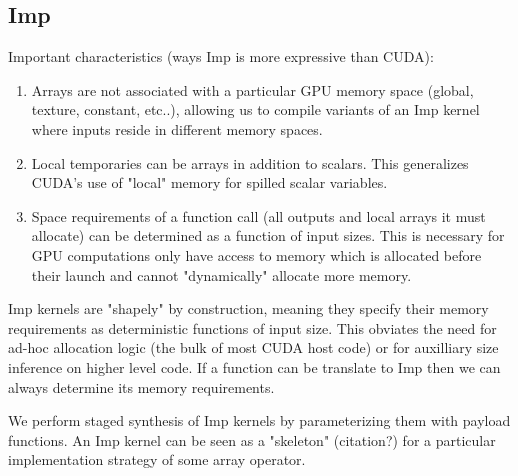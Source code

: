 \documentclass[preprint]{sigplanconf}
\begin{document}
\subsection{Imp}
Important characteristics (ways Imp is more expressive than CUDA):
\begin{enumerate}
\item  Arrays are not associated with a particular GPU memory space (global, texture, constant, etc..), allowing us to compile variants of an Imp kernel where inputs reside in different memory spaces. 
\item Local temporaries can be arrays in addition to scalars. This generalizes CUDA's use of "local" memory for spilled scalar variables. 
\item Space requirements of a function call (all outputs and local arrays it must allocate) can be determined as a function of input sizes. This is necessary for GPU computations only have access to memory which is allocated before their launch and cannot "dynamically" allocate more memory. 
\end{enumerate}
Imp kernels are "shapely" by construction, meaning they specify their memory requirements as deterministic functions of input size. This obviates the need for ad-hoc allocation logic (the bulk of most CUDA host code) or for auxilliary size inference on higher level code. If a function can be translate to Imp then we can always determine its memory requirements. 

We perform staged synthesis of Imp kernels by parameterizing them with payload functions. An Imp kernel can be seen as a "skeleton" (citation?) for a particular implementation strategy of some array operator.  
\end{document}
